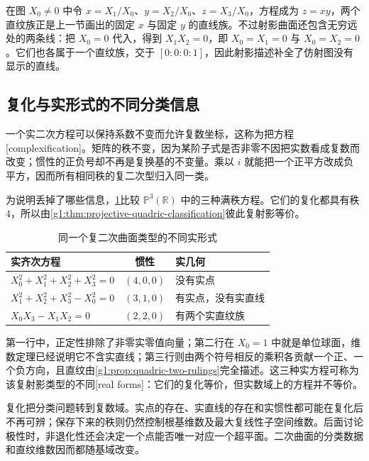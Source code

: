 在图 \(X_0\ne0\) 中令 \(x=X_1/X_0\)、\(y=X_2/X_0\)、\(z=X_3/X_0\)，方程成为 \(z=xy\)，两个直纹族正是上一节画出的固定 \(x\) 与固定 \(y\) 的直线族。不过射影曲面还包含无穷远处的两条线：把 \(X_0=0\) 代入，得到 \(X_1X_2=0\)，即 \(X_0=X_1=0\) 与 \(X_0=X_2=0\)。它们也各属于一个直纹族，交于 \([0:0:0:1]\)，因此射影描述补全了仿射图没有显示的直线。

\subsection{复化与实形式的不同分类信息}
\label{g1:subsec:0203:04}

一个实二次方程可以保持系数不变而允许复数坐标，这称为把方程[complexification]。矩阵的秩不变，因为某阶子式是否非零不因把实数看成复数而改变；惯性的正负号却不再是复换基的不变量。乘以 \(i\) 就能把一个正平方改成负平方，因而所有相同秩的复二次型归入同一类。

\ProseParagraphBreak

为说明丢掉了哪些信息，\cref{g1:tab:real-quadric-forms}比较 \(\mathbb P^3(\mathbb R)\) 中的三种满秩方程。它们的复化都具有秩 \(4\)，所以由\cref{g1:thm:projective-quadric-classification}彼此复射影等价。

\begin{table}[htbp]
	\centering
	\caption{同一个复二次曲面类型的不同实形式}
	\label{g1:tab:real-quadric-forms}
	\begin{tabularx}{\linewidth}{@{}l c X@{}}
		\toprule
		实齐次方程 & 惯性 & 实几何 \\
		\midrule
		\(X_0^2+X_1^2+X_2^2+X_3^2=0\) & \((4,0,0)\) & 没有实点 \\
		\(X_1^2+X_2^2+X_3^2-X_0^2=0\) & \((3,1,0)\) & 有实点，没有实直线 \\
		\(X_0X_3-X_1X_2=0\) & \((2,2,0)\) & 有两个实直纹族 \\
		\bottomrule
	\end{tabularx}
\end{table}

第一行中，正定性排除了非零实零值向量；第二行在 \(X_0=1\) 中就是单位球面，维数定理已经说明它不含实直线；第三行则由两个符号相反的乘积各贡献一个正、一个负方向，且直纹由\cref{g1:prop:quadric-two-rulings}完全描述。这三种实方程可称为该复射影类型的不同[real forms]：它们的复化等价，但实数域上的方程并不等价。

\ProseParagraphBreak

复化把分类问题转到复数域。实点的存在、实直线的存在和实惯性都可能在复化后不再可辨；保存下来的秩则仍然控制根基维数及最大复线性子空间维数。后面讨论极性时，非退化性还会决定一个点能否唯一对应一个超平面。二次曲面的分类数据和直纹维数因而都随基域改变。
